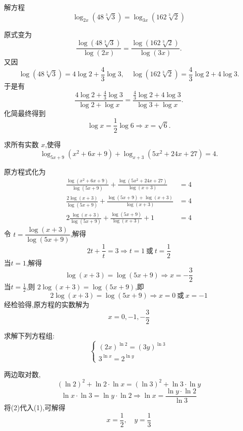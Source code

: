 \begin{questions}
    \question 解方程
    \[
    \log_{2x} \left( 48 \sqrt[3]{3} \right) = \log_{3x} \left( 162 \sqrt[3]{2} \right)
    \]
    \begin{solution}
        原式变为
        \[
        \frac{\log (48 \sqrt[3]{3})}{\log (2x)} = \frac{\log (162 \sqrt[3]{2})}{\log (3x)}.
        \]
        又因
        \[
        \log (48 \sqrt[3]{3}) = 4 \log 2 + \frac{4}{3} \log 3,\quad 
        \log (162 \sqrt[3]{2}) = \frac{4}{3} \log 2 + 4 \log 3.
        \]
        于是有
        \[
        \frac{4 \log 2 + \frac{4}{3} \log 3}{\log 2 +  \log x}
        =
        \frac{\frac{4}{3} \log 2 + 4 \log 3}{\log 3 +  \log x}.
        \]
        化简最终得到
        \[
        \log x = \frac{1}{2} \log 6 \Rightarrow x = \sqrt{6}.
        \]
    \end{solution}
    
    \question 求所有实数 $x$,使得
    \[
    \log_{5x+9}(x^2+6x+9) + \log_{x+3}(5x^2+24x+27) = 4.
    \]
    \begin{solution}
        原方程式化为
        \begin{align*}
        \frac{\log(x^2+6x+9)}{\log(5x+9)} + \frac{\log(5x^2+24x+27)}{\log(x+3)} &= 4 \\
        \frac{2\log(x+3)}{\log(5x+9)} + \frac{\log(5x+9)+\log(x+3)}{\log(x+3)} &= 4 \\
        2 \frac{\log(x+3)}{\log(5x+9)} + \frac{\log(5x+9)}{\log(x+3)} + 1 &= 4
        \end{align*}
        令 $t = \dfrac{\log(x+3)}{\log(5x+9)}$,解得
        \[
        2t + \frac{1}{t} = 3 \Rightarrow t = 1 \ \text{或}\ t = \frac{1}{2}
        \]
        当$t = 1$,解得
        \[
        \log(x+3) = \log(5x+9) \Rightarrow x = -\frac{3}{2}
        \]
        当$t = \frac{1}{2}$,则 $2\log(x+3) = \log(5x+9)$,即
        \[
        2\log(x+3) = \log(5x+9) \Rightarrow x = 0 \ \text{或}\ x = -1
        \]
        经检验得,原方程的实数解为
        \[
        x = 0, -1, -\frac{3}{2}
        \]
    \end{solution}

    \question 求解下列方程组:
    \[
    \begin{cases}
    (2x)^{\ln 2} = (3y)^{\ln 3} \\
    3^{\ln x} = 2^{\ln y}
    \end{cases}
    \]
    \begin{solution}
        两边取对数,
        \[
        (\ln 2)^2 + \ln 2 \cdot \ln x = (\ln 3)^2 + \ln 3 \cdot \ln y \tag{1}
        \]
        \[
        \ln x \cdot \ln 3 = \ln y \cdot \ln 2 \Rightarrow \ln x = \frac{\ln y \cdot \ln 2}{\ln 3}\tag{2} 
        \]
        将(2)代入(1),可解得
        \[
        x=\frac{1}{2},\quad y= \frac{1}{3}
        \]
    \end{solution}


\end{questions}
